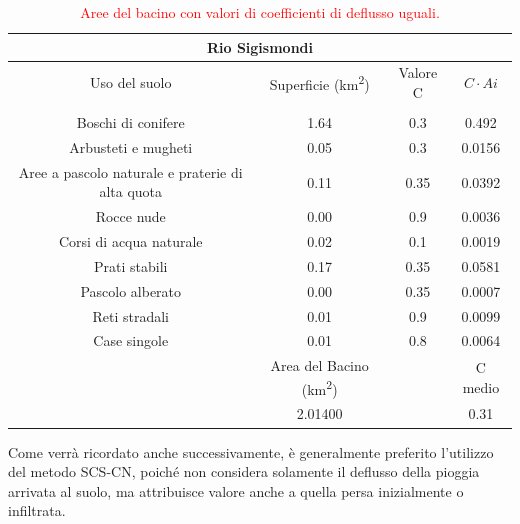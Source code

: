 \begin{table}[H] \centering
    \caption{\textcolor{red}{Aree del bacino con valori di coefficienti di deflusso uguali.}}
    \begin{tabular}{cccc}
    \toprule
    \multicolumn{4}{c}{\textbf{Rio Sigismondi}}\\
    \midrule
    Uso del suolo & Superficie (\unit{km^2})      & Valore C           & $C\cdot Ai$    \\
    &   &  &     \\
    Boschi di conifere                               & 1.64                  & 0.3                & 0.492   \\
    Arbusteti e mugheti                              & 0.05                  & 0.3                & 0.0156  \\
    Aree a pascolo naturale e praterie di alta quota & 0.11                  & 0.35               & 0.0392  \\
    Rocce nude                                       & 0.00                  & 0.9                & 0.0036  \\
    Corsi di acqua naturale                          & 0.02                  & 0.1                & 0.0019  \\
    Prati stabili                                    & 0.17                  & 0.35               & 0.0581  \\
    Pascolo alberato                                 & 0.00                  & 0.35               & 0.0007  \\
    Reti stradali                                    & 0.01                  & 0.9                & 0.0099  \\
    Case singole                                     & 0.01                  & 0.8                & 0.0064  \\
    \midrule
& Area del Bacino (\unit{km^2}) &  & C medio \\
  & 2.01400               &                    & 0.31 \\
  \bottomrule  
    \end{tabular}
    \end{table}

Come verrà ricordato anche successivamente, è generalmente preferito l'utilizzo del metodo SCS-CN, poiché non considera solamente il deflusso della pioggia arrivata al suolo, ma attribuisce valore anche a quella persa inizialmente o infiltrata.    

